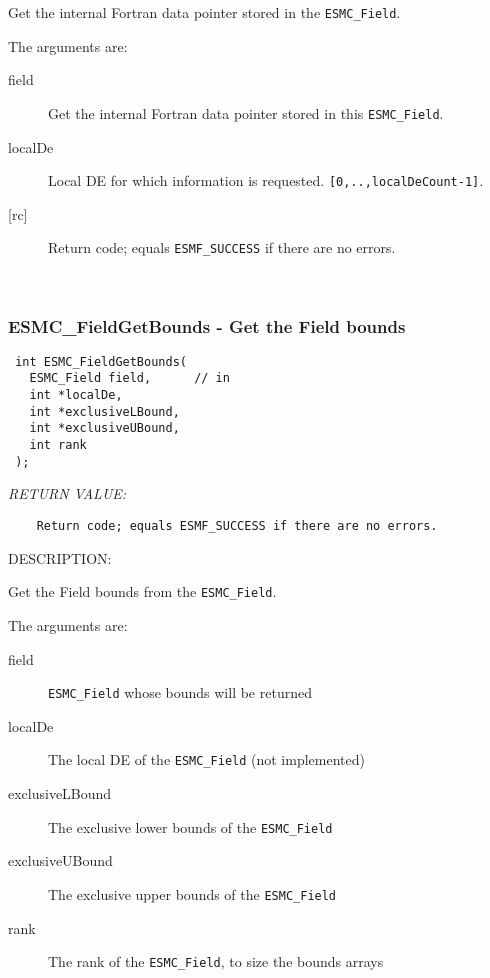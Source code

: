   
    Get the internal Fortran data pointer stored in the {\tt ESMC\_Field}.
  
    The arguments are:
    \begin{description}
    \item[field]
      Get the internal Fortran data pointer stored in this {\tt ESMC\_Field}.
    \item[localDe]
      Local DE for which information is requested. {\tt [0,..,localDeCount-1]}. 
    \item[{[rc]}]
      Return code; equals {\tt ESMF\_SUCCESS} if there are no errors.
    \end{description}
   
 
\mbox{}\hrulefill\ 
 
\subsubsection [ESMC\_FieldGetBounds] {ESMC\_FieldGetBounds - Get the Field bounds}


  
\begin{verbatim} int ESMC_FieldGetBounds(
   ESMC_Field field,      // in
   int *localDe,
   int *exclusiveLBound,
   int *exclusiveUBound,
   int rank
 );
 \end{verbatim}{\em RETURN VALUE:}
\begin{verbatim}    Return code; equals ESMF_SUCCESS if there are no errors.\end{verbatim}
{\sf DESCRIPTION:\\ }


  
    Get the Field bounds from the {\tt ESMC\_Field}.
  
    The arguments are:
    \begin{description}
    \item[field]
      {\tt ESMC\_Field} whose bounds will be returned
    \item[localDe]
      The local DE of the {\tt ESMC\_Field} (not implemented)
    \item[exclusiveLBound]
      The exclusive lower bounds of the {\tt ESMC\_Field}
    \item[exclusiveUBound]
      The exclusive upper bounds of the {\tt ESMC\_Field}
    \item[rank]
      The rank of the {\tt ESMC\_Field}, to size the bounds arrays
    \end{description}
   
